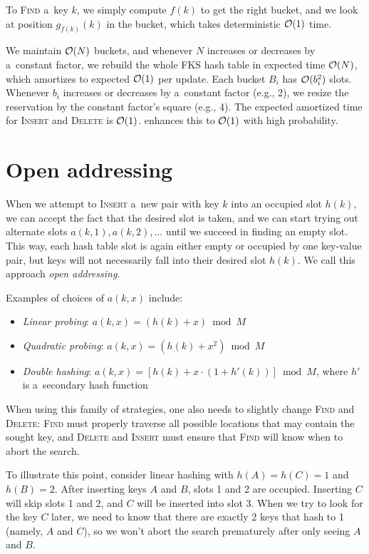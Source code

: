 To \textsc{Find} a~key $k$, we simply compute $f(k)$ to get the right bucket,
and we look at position $g_{f(k)}(k)$ in the bucket, which takes deterministic
$\mathcal{O}(1)$ time.

We maintain $\mathcal{O}(N)$ buckets, and whenever $N$ increases or decreases by
a~constant factor, we rebuild the whole FKS hash table in expected time
$\mathcal{O}(N)$, which amortizes to expected $\mathcal{O}(1)$ per update. Each bucket $B_i$
has $\mathcal{O}(b_i^2)$ slots. Whenever $b_i$ increases or decreases by a~constant
factor (e.g., 2), we resize the reservation by the constant factor's square
(e.g., 4).
The expected amortized time for \textsc{Insert} and \textsc{Delete} is $\mathcal{O}(1)$.
\cite{univ-class-of-hfns} enhances this to $\mathcal{O}(1)$ with high probability.

\section{Open addressing}
\label{sec:open-addressing}
When we attempt to \textsc{Insert} a~new pair with key $k$ into an occupied slot
$h(k)$, we can accept the fact that the desired slot is taken, and we can start
trying out alternate slots $a(k,1), a(k,2), \ldots$ until we succeed in
finding an empty slot. This way, each hash table slot is again either empty or
occupied by one key-value pair, but keys will not necessarily fall into their
desired slot $h(k)$.
We call this approach \emph{open addressing}.

Examples of choices of $a(k,x)$ include:
\begin{itemize}
\item \emph{Linear probing}: $a(k,x)=(h(k)+x) \bmod M$
\item \emph{Quadratic probing}: $a(k,x)=(h(k)+x^2) \bmod M$
\item \emph{Double hashing}: $a(k,x)=[h(k)+x\cdot (1+h'(k))]\bmod M$, where
	$h'$ is a~secondary hash function
\end{itemize}

When using this family of strategies, one also needs to slightly change
\textsc{Find} and \textsc{Delete}: \textsc{Find} must properly traverse
all possible locations that may contain the sought key, and \textsc{Delete}
and \textsc{Insert} must ensure that \textsc{Find} will know when to abort
the search.

To illustrate this point, consider linear hashing with $h(A)=h(C)=1$ and
$h(B)=2$. After inserting keys $A$ and $B$, slots 1 and 2 are occupied.
Inserting $C$ will skip slots 1 and 2, and $C$ will be inserted into slot 3.
When we try to look for the key $C$ later, we need to know that there are
exactly 2 keys that hash to 1 (namely, $A$ and $C$), so we won't abort
the search prematurely after only seeing $A$ and $B$.

